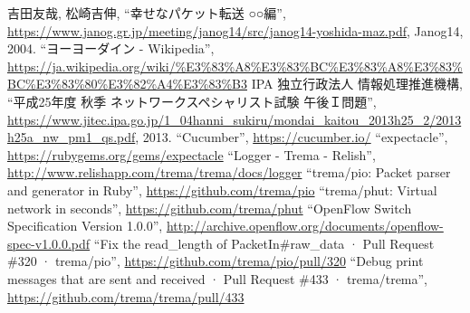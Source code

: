 \begin{thebibliography}{99}
         吉田友哉, 松崎吉伸,
         ``幸せなパケット転送 ○○編'',
         \url{https://www.janog.gr.jp/meeting/janog14/src/janog14-yoshida-maz.pdf},
         Janog14, 2004.
         ``ヨーヨーダイン - Wikipedia'',
         \url{https://ja.wikipedia.org/wiki/\%E3\%83\%A8\%E3\%83\%BC\%E3\%83\%A8\%E3\%83\%BC\%E3\%83\%80\%E3\%82\%A4\%E3\%83\%B3}
         IPA 独立行政法人 情報処理推進機構,
         ``平成25年度 秋季 ネットワークスペシャリスト試験 午後Ｉ問題'',
         \url{https://www.jitec.ipa.go.jp/1_04hanni_sukiru/mondai_kaitou_2013h25_2/2013h25a_nw_pm1_qs.pdf}, 2013.
         ``Cucumber'',
         \url{https://cucumber.io/}
         ``expectacle'',
         \url{https://rubygems.org/gems/expectacle}
         ``Logger - Trema - Relish'',
         \url{http://www.relishapp.com/trema/trema/docs/logger}
         ``trema/pio: Packet parser and generator in Ruby'',
         \url{https://github.com/trema/pio}
         ``trema/phut: Virtual network in seconds'',
         \url{https://github.com/trema/phut}
         ``OpenFlow Switch Specification Version 1.0.0'',
         \url{http://archive.openflow.org/documents/openflow-spec-v1.0.0.pdf}
         ``Fix the read\_length of PacketIn\#raw\_data · Pull Request \#320 · trema/pio'',
         \url{https://github.com/trema/pio/pull/320}
  ``Debug print messages that are sent and received · Pull Request \#433 · trema/trema'',
         \url{https://github.com/trema/trema/pull/433}
\end{thebibliography}

